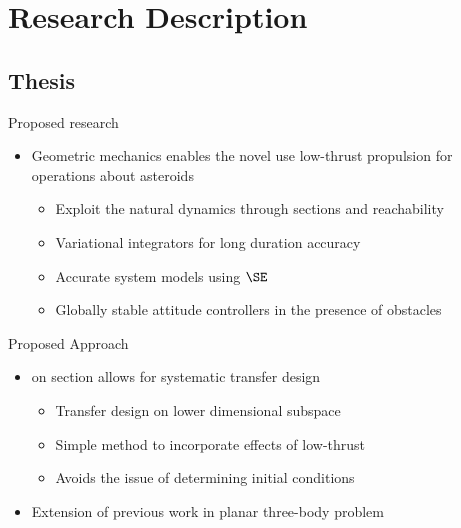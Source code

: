
\section*{Research Description}
\subsection*{Thesis}

\begin{frame}[t]{Proposed research}
    \begin{itemize}
        \item Geometric mechanics enables the novel use low-thrust propulsion for operations about asteroids
        \begin{itemize}     
            \item Exploit the natural dynamics through \Poincare sections and reachability
            \item Variational integrators for long duration accuracy
            \item Accurate system models using \( \SE \)
            \item Globally stable attitude controllers in the presence of obstacles
        \end{itemize}
    \end{itemize}

\end{frame}

\begin{frame}[t]{Proposed Approach} %
  \begin{itemize}
      \item {} on \Poincare section allows for systematic transfer design
        \begin{itemize}
            \item Transfer design on lower dimensional subspace
            \item Simple method to incorporate effects of low-thrust 
            \item Avoids the issue of determining initial conditions
        \end{itemize}
        \pause
      \item Extension of previous work in planar three-body problem     
  \end{itemize}

\end{frame} %


